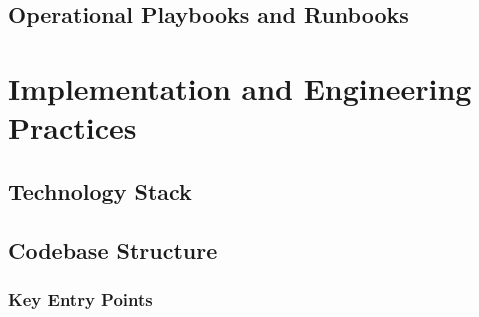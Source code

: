 \documentclass[a4paper,twoside]{sapthesis}
\begin{document}
\section{Operational Playbooks and Runbooks}
\label{sec:runbooks}



\chapter{Implementation and Engineering Practices}
\label{ch:implementation}


\section{Technology Stack}
\label{sec:tech-stack}

\section{Codebase Structure}
\label{sec:codebase}

\subsection{Key Entry Points}
\end{document}
